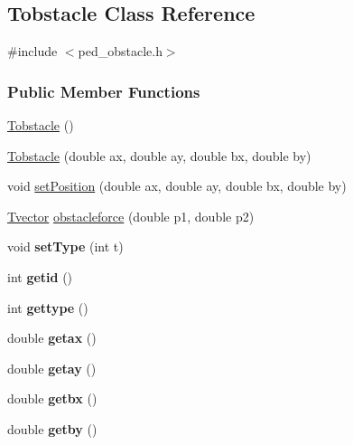 \hypertarget{classTobstacle}{
\subsection{Tobstacle Class Reference}
\label{classTobstacle}
}


{\ttfamily \#include $<$ped\_\-obstacle.h$>$}

\subsubsection*{Public Member Functions}
\begin{DoxyCompactItemize}
\item 
\hyperlink{classTobstacle_abbab157e9f36a7196b460860794534ae}{Tobstacle} ()
\item 
\hyperlink{classTobstacle_acbcc89a8792bf6d21a75297fa36a395a}{Tobstacle} (double ax, double ay, double bx, double by)
\item 
void \hyperlink{classTobstacle_a69c44343f9845d79436d98605a441595}{setPosition} (double ax, double ay, double bx, double by)
\item 
\hyperlink{classTvector}{Tvector} \hyperlink{classTobstacle_ae9230d22bf2f14a0dd531be0f461e3ea}{obstacleforce} (double p1, double p2)
\item 
\hypertarget{classTobstacle_addf6e12bbe48ed714acf19654918b8f3}{
void {\bfseries setType} (int t)}
\label{classTobstacle_addf6e12bbe48ed714acf19654918b8f3}

\item 
\hypertarget{classTobstacle_a427de15f0e8cf516c660271f971cd153}{
int {\bfseries getid} ()}
\label{classTobstacle_a427de15f0e8cf516c660271f971cd153}

\item 
\hypertarget{classTobstacle_a9b677519902f8fbc8c9713a8e5493587}{
int {\bfseries gettype} ()}
\label{classTobstacle_a9b677519902f8fbc8c9713a8e5493587}

\item 
\hypertarget{classTobstacle_aeb63d28ee363f8f3b295ef88f900776f}{
double {\bfseries getax} ()}
\label{classTobstacle_aeb63d28ee363f8f3b295ef88f900776f}

\item 
\hypertarget{classTobstacle_afcbbd1972b6dd0902ed1b330c67c6713}{
double {\bfseries getay} ()}
\label{classTobstacle_afcbbd1972b6dd0902ed1b330c67c6713}

\item 
\hypertarget{classTobstacle_a6e4007a0c9a7259189c134eb19659cad}{
double {\bfseries getbx} ()}
\label{classTobstacle_a6e4007a0c9a7259189c134eb19659cad}

\item 
\hypertarget{classTobstacle_a5833a4d1966204d79cc7e3606f351526}{
double {\bfseries getby} ()}
\label{classTobstacle_a5833a4d1966204d79cc7e3606f351526}

\end{DoxyCompactItemize}


